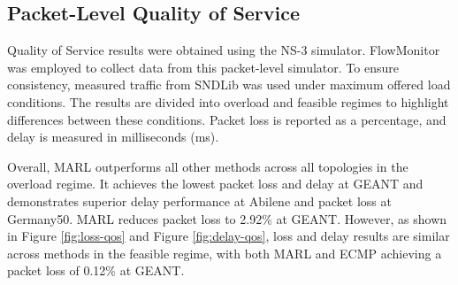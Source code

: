 


\subsection{Packet-Level Quality of Service}
\label{sec:res-qos}
Quality of Service results were obtained using the NS-3 simulator. FlowMonitor was employed to collect data from this packet-level simulator. To ensure consistency, measured traffic from SNDLib was used under maximum offered load conditions. The results are divided into overload and feasible regimes to highlight differences between these conditions. Packet loss is reported as a percentage, and delay is measured in milliseconds (ms).

Overall, MARL outperforms all other methods across all topologies in the overload regime. It achieves the lowest packet loss and delay at GEANT and demonstrates superior delay performance at Abilene and packet loss at Germany50. MARL reduces packet loss to 2.92\% at GEANT. However, as shown in Figure \ref{fig:loss-qos} and Figure \ref{fig:delay-qos}, loss and delay results are similar across methods in the feasible regime, with both MARL and ECMP achieving a packet loss of 0.12\% at GEANT.

